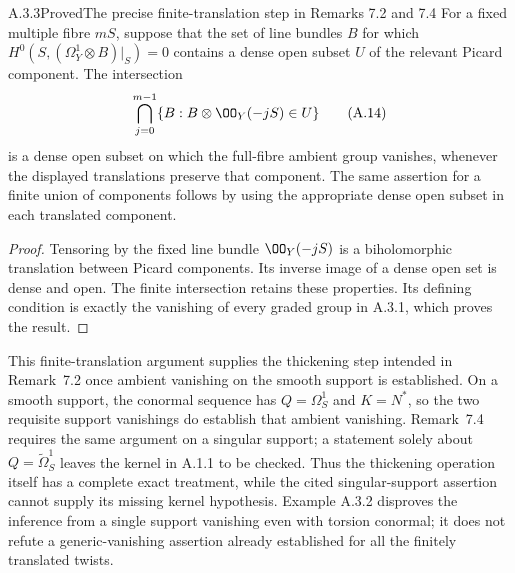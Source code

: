 \begin{statement}{A.3.3}{Proved}{The precise finite-translation step in Remarks 7.2 and 7.4}
For a fixed multiple fibre $mS$, suppose that the set of line bundles $B$ for which $H^0(S,(\Omega_Y^1\otimes B)|_S)=0$ contains a dense open subset $U$ of the relevant Picard component. The intersection
\[
\bigcap_{j=0}^{m-1}\{B:B\otimes\OO_Y(-jS)\in U\}
\tag{A.14}
\]
is a dense open subset on which the full-fibre ambient group vanishes, whenever the displayed translations preserve that component. The same assertion for a finite union of components follows by using the appropriate dense open subset in each translated component.
\end{statement}
\begin{proof}
Tensoring by the fixed line bundle $\OO_Y(-jS)$ is a biholomorphic translation between Picard components. Its inverse image of a dense open set is dense and open. The finite intersection retains these properties. Its defining condition is exactly the vanishing of every graded group in A.3.1, which proves the result.
\end{proof}

This finite-translation argument supplies the thickening step intended in Remark~7.2 once ambient vanishing on the smooth support is established. On a smooth support, the conormal sequence has $Q=\Omega_S^1$ and $K=N^*$, so the two requisite support vanishings do establish that ambient vanishing. Remark~7.4 requires the same argument on a singular support; a statement solely about $Q=\widetilde\Omega_S^1$ leaves the kernel in A.1.1 to be checked. Thus the thickening operation itself has a complete exact treatment, while the cited singular-support assertion cannot supply its missing kernel hypothesis. Example A.3.2 disproves the inference from a single support vanishing even with torsion conormal; it does not refute a generic-vanishing assertion already established for all the finitely translated twists.

